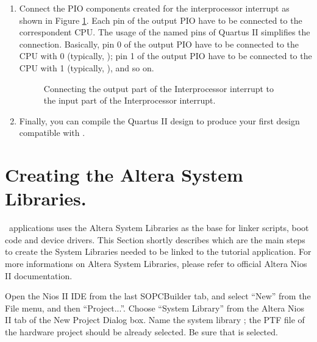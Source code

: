 \begin{enumerate}
\item Connect the PIO components created for the interprocessor
  interrupt as shown in Figure
  \ref{fig:tutorial_quartus_ipic_pio}. Each pin of the output PIO have
  to be connected to the correspondent CPU. The usage of the named
  pins of Quartus II simplifies the connection. Basically, pin 0 of
  the output PIO have to be connected to the CPU with  0
  (typically, ); pin 1 of the output PIO have to be
  connected to the CPU with  1 (typically,
  ), and so on.
%
\begin{figure}

\caption{\label{fig:tutorial_quartus_ipic_pio}Connecting the output
part of the Interprocessor interrupt to the input part of the
Interprocessor interrupt.}
\end{figure}

\item Finally, you can compile the Quartus II design to produce your
  first design compatible with \ee.
\end{enumerate}



\section{Creating the Altera System Libraries.}

\ee\ applications uses the Altera System Libraries as the base for
linker scripts, boot code and device drivers. This Section shortly
describes which are the main steps to create the System Libraries
needed to be linked to the tutorial application. For more informations
on Altera System Libraries, please refer to official Altera Nios II
documentation.

Open the Nios II IDE from the last SOPCBuilder tab, and select
{}``New'' from the File menu, and then ``Project...''. Choose
{}``System Library'' from the Altera Nios II tab of the New Project
Dialog box. Name the system library ; the PTF
file of the hardware project should be already selected. Be sure that
 is selected.

